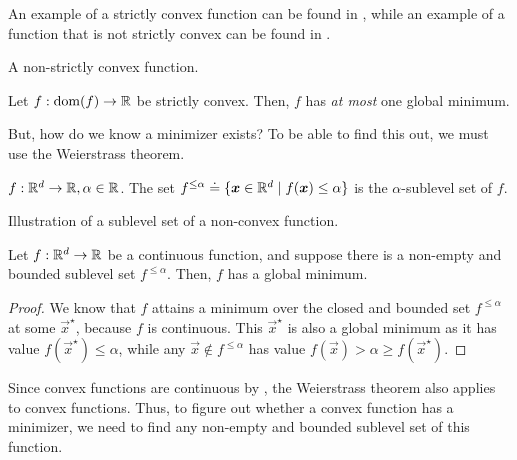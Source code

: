 An example of a strictly convex function can be found in , while an example of
a function that is not strictly convex can be found in .

\begin{marginfigure}
    \centering
    \caption{A non-strictly convex function.}
    \label{fig:non-strict-convexity}
\end{marginfigure}

\begin{lemma}
    Let $f: \mathrm{dom}(f) \to \mathbb{R}$ be strictly convex. Then, $f$ has \textit{at most} one global minimum.
\end{lemma}

But, how do we know a minimizer exists? To be able to find this out, we must use the Weierstrass
theorem.

\begin{definition}
    $f: \mathbb{R}^d \to \mathbb{R}, \alpha\in \mathbb{R}$. The set $f^{\leq \alpha} \doteq \{ \bm{x}\in \mathbb{R}^d \mid f(\bm{x}) \leq \alpha \}$ is the $\alpha$-sublevel set of $f$.
\end{definition}

\begin{marginfigure}
    \centering
    \caption{Illustration of a sublevel set of a non-convex function.}
    \label{fig:sublevel-set}
\end{marginfigure}

\begin{theorem}[Weierstrass]
    Let $f: \mathbb{R}^d \to \mathbb{R}$ be a continuous function, and suppose there is a non-empty and bounded
    sublevel set $f^{\leq \alpha}$. Then, $f$ has a global minimum.
\end{theorem}

\begin{proof}
    We know that $f$ attains a minimum over the closed and bounded set $f^{\leq \alpha}$ at some
    $\vec{x}^\star$, because $f$ is continuous. This $\vec{x}^\star$ is also a global minimum as it
    has value $f(\vec{x}^\star) \leq \alpha$, while any $\vec{x} \not\in f^{\leq \alpha}$ has value
    $f(\vec{x}) > \alpha \geq f(\vec{x}^\star)$.
\end{proof}

Since convex functions are continuous by , the Weierstrass theorem also
applies to convex functions. Thus, to figure out whether a convex function has a minimizer, we need
to find any non-empty and bounded sublevel set of this function.

